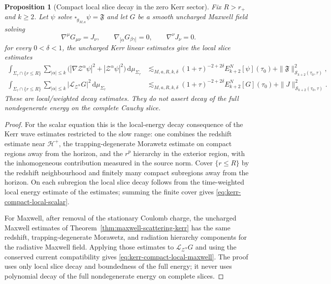 \documentclass[11pt]{article}
\numberwithin{equation}{section}
\theoremstyle{plain}
\newtheorem{proposition}[theorem]{Proposition}
\theoremstyle{definition}
\theoremstyle{remark}
\newcommand{\dd}{\mathrm{d}}
\begin{document}
\begin{proposition}[Compact local slice decay in the zero Kerr sector]\label{prop:kerr-compact-local-slice-decay}
Fix $R>r_{+}$ and $k\ge2$. Let $\psi$ solve $\square_{g_{M,a}}\psi=\mathfrak F$ and let $G$ be a smooth uncharged Maxwell field solving
\begin{equation}
\nabla^{\mu}G_{\mu\nu}=J_{\nu},\qquad \nabla_{[\alpha}G_{\beta\gamma]}=0,
\qquad \nabla^\nu J_\nu=0.
\end{equation}
for every $0<\delta<1$, the uncharged Kerr linear estimates give the local slice estimates
\begin{eqnarray}
\int_{\Sigma_\tau\cap\{r\le R\}}
\sum_{|\alpha|\le k}\bigl(|\nabla \mathcal Z^\alpha\psi|^2+|\mathcal Z^\alpha\psi|^2\bigr)
\,\dd\mu_{\Sigma_\tau}
&\lesssim_{M,a,R,k,\delta}
(1+\tau)^{-2+2\delta}E^N_{k+2}[\psi](\tau_0)
+\|\mathfrak F\|_{\mathcal S_{k+2}(\tau_0,\tau)}^2,
\label{eq:kerr-compact-local-scalar}\\
\int_{\Sigma_\tau\cap\{r\le R\}}
\sum_{|\alpha|\le k}|\mathcal L_{\mathcal Z^\alpha}G|^2
\,\dd\mu_{\Sigma_\tau}
&\lesssim_{M,a,R,k,\delta}
(1+\tau)^{-2+2\delta}E^N_{k+2}[G](\tau_0)
+\|J\|_{\mathcal S_{k+2}(\tau_0,\tau)}^2.
\label{eq:kerr-compact-local-maxwell}
\end{eqnarray}
These are local/weighted decay estimates. They do not assert decay of the full nondegenerate energy on the complete Cauchy slice.
\end{proposition}

\begin{proof}
For the scalar equation this is the local-energy decay consequence of the Kerr wave estimates restricted to the slow range: one combines the redshift estimate near $\mathcal H^+$, the trapping-degenerate Morawetz estimate on compact regions away from the horizon, and the $r^p$ hierarchy in the exterior region, with the inhomogeneous contribution measured in the source norm. Cover $\{r\le R\}$ by the redshift neighbourhood and finitely many compact subregions away from the horizon. On each subregion the local slice decay follows from the time-weighted local energy estimate of the estimates; summing the finite cover gives \eqref{eq:kerr-compact-local-scalar}.

For Maxwell, after removal of the stationary Coulomb charge, the uncharged Maxwell estimates of Theorem~\ref{thm:maxwell-scattering-kerr} has the same redshift, trapping-degenerate Morawetz, and radiation hierarchy components for the radiative Maxwell field. Applying those estimates to $\mathcal L_{\mathcal Z^\alpha}G$ and using the conserved current compatibility gives \eqref{eq:kerr-compact-local-maxwell}. The proof uses only local slice decay and boundedness of the full energy; it never uses polynomial decay of the full nondegenerate energy on complete slices.
\end{proof}
\end{document}
